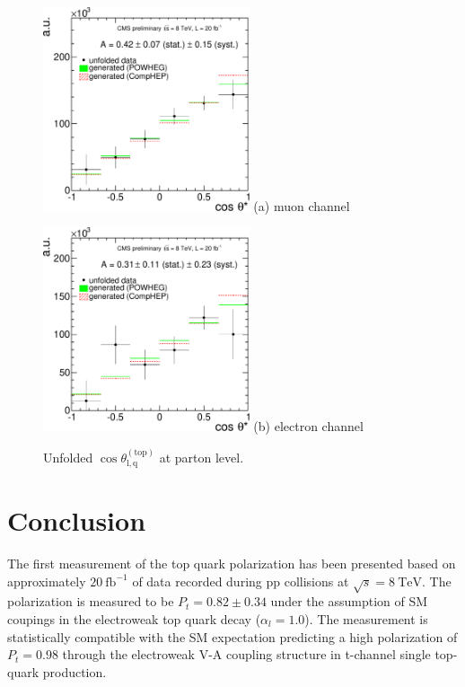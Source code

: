 \documentclass[a4paper]{jpconf}
\newcommand{\unit}[1]{\ensuremath{\mathrm{~#1}}}
\newcommand{\costheta}[0]{\cos\theta_{\mathrm{l,q}}^{\mathrm{(top)}}}
\begin{document}
\begin{figure}[h]
\begin{center}
\begin{minipage}{7cm}
\includegraphics[height=6.0cm]{costheta_unfolded_mu-crop}
\center (a) muon channel
\end{minipage}\hspace{1cm}%
\begin{minipage}{7cm}
\includegraphics[height=6.0cm]{costheta_unfolded_el-crop}
\center (b) electron channel
\end{minipage} 
\caption{\label{fig:unfoldcostheta}Unfolded $\costheta$ at parton level.}
\end{center}
\end{figure}

\section{Conclusion}
The first measurement of the top quark polarization has been presented based on approximately $20\unit{fb^{-1}}$ of data recorded during pp collisions at $\sqrt{s}=8\unit{TeV}$.
The polarization is measured to be $P_{t}=0.82 \pm 0.34$ under the assumption of SM coupings in the electroweak top quark decay ($\alpha_{l}=1.0$). The measurement is statistically compatible with the SM expectation predicting a high polarization of $P_{t}=0.98$ through the electroweak V-A coupling structure in t-channel single top-quark production.
\end{document}
